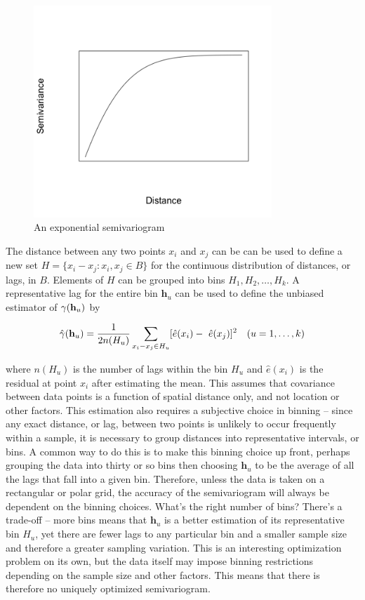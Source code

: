 \documentclass[12pt,twoside]{reedthesis}
\begin{document}
\begin{figure}[h]
    \centering
    \includegraphics[width=0.8\textwidth]{semivariogram}
    \caption{An exponential semivariogram}
    \label{fig:semivariogram}
\end{figure}

The distance between any two points $x_i$ and $x_j$ can be can be used to define a new set $H = \{ x_i - x_j: x_i, x_j \in B \}$ for the continuous distribution of distances, or lags, in $B$. Elements of $H$ can be grouped into bins $H_1, H_2, \dots, H_k$. A representative lag for the entire bin $\mathbf{h}_u$ can be used to define the unbiased estimator of $\gamma(\bold{h}_u)$ by

\begin{align*} 
   \hat\gamma(\bold{h}_u) = { 1 \over {2n(H_u)}} \sum_{x_i - x_j \in H_u} [ \hat e(x_i) - \
   \hat e(x_j) ] ^2 \quad (u = 1, \dots, k)
\end{align*}

\noindent where $n(H_u)$ is the number of lags within the bin $H_u$ and $\hat e(x_i)$ is the residual at point $x_i$ after estimating the mean. This assumes that covariance between data points is a function of spatial distance only, and not location or other factors. This estimation also requires a subjective choice in binning -- since any exact distance, or lag, between two points is unlikely to occur frequently within a sample, it is necessary to group distances into representative intervals, or bins. A common way to do this is to make this binning choice up front, perhaps grouping the data into thirty or so bins then choosing $\mathbf{h}_u$ to be the average of all the lags that fall into a given bin. Therefore, unless the data is taken on a rectangular or polar grid, the accuracy of the semivariogram will always be dependent on the binning choices. What's the right number of bins? There's a trade-off -- more bins means that $\mathbf{h}_u$ is a better estimation of its representative bin $H_u$, yet there are fewer lags to any particular bin and a smaller sample size and therefore a greater sampling variation. This is an interesting optimization problem on its own, but the data itself may impose binning restrictions depending on the sample size and other factors. This means that there is therefore no uniquely optimized semivariogram. \\
\end{document}
